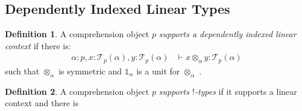 \documentclass[10pt]{article}
\theoremstyle{definition}
\newtheorem{definition}{Definition}
\newcommand{\yields}{\vdash}
\newcommand\El[2]{\mathcal{T}_{#1}(#2)}
\newcommand\One{\ensuremath{\mathds{1}}}
\begin{document}

\subsection{Dependently Indexed Linear Types}


\begin{definition}
A comprehension object $p$ \emph{supports a dependently indexed linear context} if there is:
\begin{align*}
\alpha : p, x : \El{p}{\alpha}, y : \El{p}{\alpha} &\yields x \otimes_\alpha y : \El{p}{\alpha}
\end{align*}
such that $\otimes_\alpha$ is symmetric and $\One_\alpha$ is a unit for $\otimes_\alpha$ . 
\end{definition}

\begin{definition}
A comprehension object $p$ \emph{supports $!$-types} if it supports a linear context and there is 
\end{definition}
\end{document}
